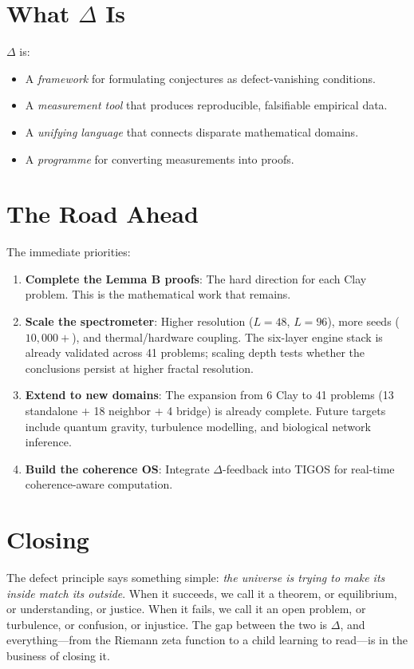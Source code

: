 \documentclass[12pt, openany]{book}
\theoremstyle{remark}
\begin{document}
\section{What $\Delta$ Is}

$\Delta$ is:
\begin{itemize}
  \item A \emph{framework} for formulating conjectures as defect-vanishing conditions.
  \item A \emph{measurement tool} that produces reproducible, falsifiable empirical data.
  \item A \emph{unifying language} that connects disparate mathematical domains.
  \item A \emph{programme} for converting measurements into proofs.
\end{itemize}

\section{The Road Ahead}

The immediate priorities:
\begin{enumerate}
  \item \textbf{Complete the Lemma B proofs}: The hard direction for each Clay problem.
        This is the mathematical work that remains.
  \item \textbf{Scale the spectrometer}: Higher resolution ($L = 48$, $L = 96$),
        more seeds ($10{,}000{+}$), and thermal/hardware coupling.  The six-layer
        engine stack is already validated across 41 problems; scaling depth tests
        whether the conclusions persist at higher fractal resolution.
  \item \textbf{Extend to new domains}: The expansion from 6 Clay to 41 problems
        (13 standalone $+$ 18 neighbor $+$ 4 bridge) is already complete.
        Future targets include quantum gravity, turbulence modelling, and
        biological network inference.
  \item \textbf{Build the coherence OS}: Integrate $\Delta$-feedback into TIGOS for
        real-time coherence-aware computation.
\end{enumerate}

\section{Closing}

The defect principle says something simple: \emph{the universe is trying to make
its inside match its outside}. When it succeeds, we call it a theorem, or
equilibrium, or understanding, or justice. When it fails, we call it an open
problem, or turbulence, or confusion, or injustice. The gap between the two
is $\Delta$, and everything---from the Riemann zeta function to a child learning
to read---is in the business of closing it.
\end{document}
